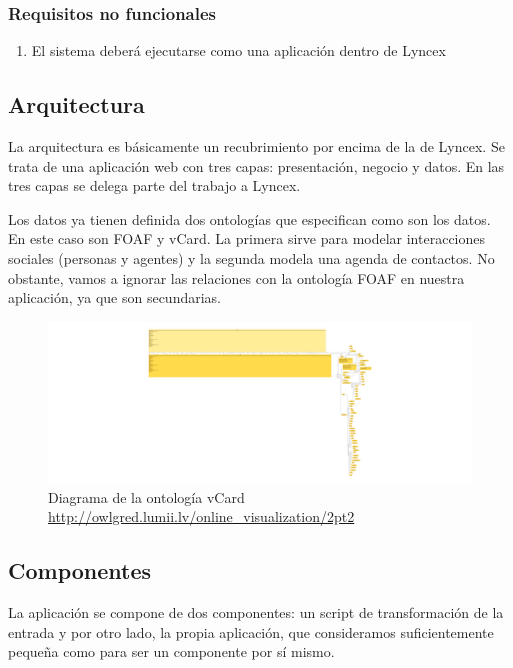 \documentclass[12pt]{report} %
\begin{document}
\subsubsection{Requisitos no funcionales}
\begin{enumerate}
    \item El sistema deberá ejecutarse como una aplicación dentro de Lyncex
\end{enumerate}

\subsection{Arquitectura}

La arquitectura es básicamente un recubrimiento por encima de la de Lyncex. Se trata de una aplicación web con tres capas: presentación, negocio y datos. En las tres capas se delega parte del trabajo a Lyncex.

Los datos ya tienen definida dos ontologías que especifican como son los datos. En este caso son FOAF y vCard. La primera sirve para modelar interacciones sociales (personas y agentes) y la segunda modela una agenda de contactos. No obstante, vamos a ignorar las relaciones con la ontología FOAF en nuestra aplicación, ya que son secundarias.

\begin{figure}
    \centering
    \includegraphics[width=\textwidth]{vcard.png}
    \caption{Diagrama de la ontología vCard \\ \url{http://owlgred.lumii.lv/online_visualization/2pt2}}
    \label{fig:vcard}
\end{figure}

\subsection{Componentes}

La aplicación se compone de dos componentes: un script de transformación de la entrada y por otro lado, la propia aplicación, que consideramos suficientemente pequeña como para ser un componente por sí mismo.
\end{document}
